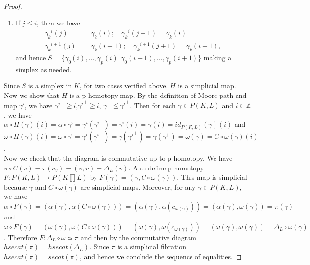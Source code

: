 \documentclass[preprint,11pt %
]{hjm1}
\theoremstyle{definition}
\begin{document}
\begin{proof}
\begin{enumerate}
\begin{align*}
 {\gamma _{k}}^{i+1}(j)&=\gamma _{k}(j);\quad {\gamma _{k}}^{i+1}(j+1)=\gamma _{k}(j+1),
 \end{align*}
and therefore 
$
S=\lbrace \gamma _{0}(j),...,\gamma _{p}(j),\gamma _{0}(j+1),...,\gamma _{p}(j+1)   \rbrace$ being a simplex as desired.
\item[(ii)]
If $j\leq i$, then we have 
\begin{align*}
 {\gamma _{k}}^{i}(j)&=\gamma _{k}(i);\quad {\gamma _{k}}^{i}(j+1)=\gamma _{k}(i)\\
 {\gamma _{k}}^{i+1}(j)&=\gamma _{k}(i+1);\quad {\gamma _{k}}^{i+1}(j+1)=\gamma _{k}(i+1),
 \end{align*}
and hence 
$
S=\lbrace \gamma _{0}(i),...,\gamma _{p}(i),\gamma _{0}(i+1),...,\gamma _{p}(i+1)   \rbrace$ making a simplex as needed.
 \end{enumerate}
Since $S$ is a simplex in $K$, for two cases verified above, $H$ is a simplicial map.
Now we show that $H$ is a p-homotopy map.
By the definition of Moore path and map $\gamma ^{i}$, we have ${\gamma^{i}}^{-}\geq i$,${\gamma^{i}}^{+}\geq i$, $\gamma ^{+}\leq {\gamma^{i}}^{+}$.
Then for each $\gamma \in P(K,L)$ and $i\in \mathbb{Z}$, we have $\alpha \circ H ( \gamma) (i)=\alpha \circ \gamma ^{i}=\gamma ^{i}({\gamma ^{i}}^{-})=\gamma ^i (i)=\gamma (i) = id_{P(K,L)} (\gamma) (i)$ and $\omega \circ H (\gamma) (i)=\omega \circ \gamma ^{i}=\gamma ^{i}({\gamma^{i}}^{+})=\gamma ({\gamma ^i}^{+})= \gamma (\gamma ^{+})=\omega (\gamma )=C\circ \omega(\gamma )(i)$.\\
Now we check that the diagram is commutative up to p-homotopy. We have 
$\pi \circ C(v)=\pi (c_{v})=(v,v)=\Delta _{L}(v)$. Also define p-homotopy $F:P(K,L)\to P(K\prod L)$ by $F(\gamma )=(\gamma ,C\circ \omega (\gamma))$. This map is 
 simplicial because $\gamma $ and $C \circ \omega (\gamma)$ are simplicial maps. Moreover, for any $\gamma \in P(K,L)$, we have 
$\alpha \circ F(\gamma )=(\alpha (\gamma ), \alpha (C\circ \omega (\gamma )))=(\alpha (\gamma ),\alpha (c_{\omega (\gamma )}))=(\alpha (\gamma ), \omega (\gamma ))=\pi (\gamma)$ and $\omega \circ F(\gamma )=(\omega (\gamma ),\omega (C\circ \omega (\gamma )))=(\omega (\gamma ),\omega (c_{\omega (\gamma )}))=(\omega (\gamma ),\omega (\gamma ))=\Delta _{L} \circ \omega(\gamma )$. 
Therefore $F: \Delta _{L}\circ \omega\simeq \pi$ and then by the commutative diagram $hsecat (\pi) = hsecat (\Delta_L)$.
Since $\pi$ is a simplicial fibration $hsecat (\pi) = secat (\pi)$, and hence we conclude the sequence of equalities.
 \end{proof}
\end{document}
